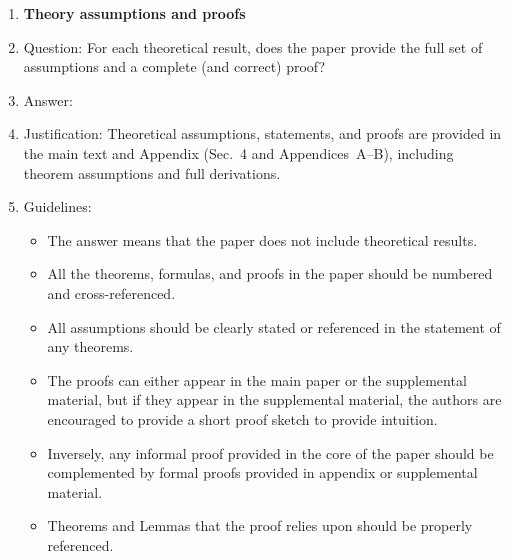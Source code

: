 \documentclass{article}
\begin{document}
\begin{enumerate}
\item {\bf Theory assumptions and proofs}
    \item[] Question: For each theoretical result, does the paper provide the full set of assumptions and a complete (and correct) proof?
    \item[] Answer: \answerYes{} %
    \item[] Justification: Theoretical assumptions, statements, and proofs are provided in the main text and Appendix (Sec.~4 and Appendices~A--B), including theorem assumptions and full derivations.
    \item[] Guidelines:
    \begin{itemize}
        \item The answer \answerNA{} means that the paper does not include theoretical results. 
        \item All the theorems, formulas, and proofs in the paper should be numbered and cross-referenced.
        \item All assumptions should be clearly stated or referenced in the statement of any theorems.
        \item The proofs can either appear in the main paper or the supplemental material, but if they appear in the supplemental material, the authors are encouraged to provide a short proof sketch to provide intuition. 
        \item Inversely, any informal proof provided in the core of the paper should be complemented by formal proofs provided in appendix or supplemental material.
        \item Theorems and Lemmas that the proof relies upon should be properly referenced. 
    \end{itemize}


\end{enumerate}
\end{document}
